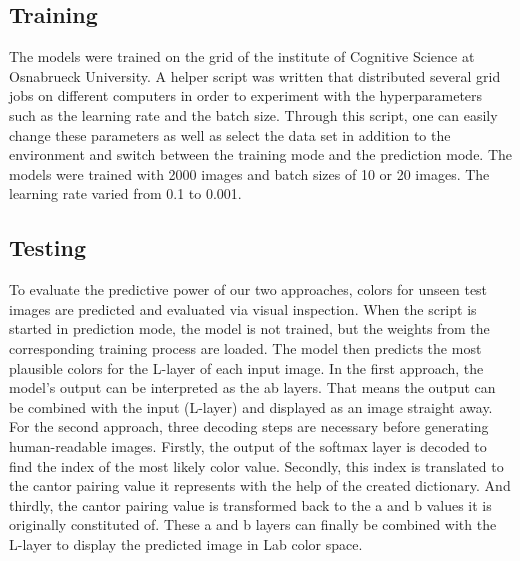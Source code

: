 \documentclass[12pt,letterpaper]{article}
\begin{document}

\subsection{Training}
The models were trained on the grid of the institute of Cognitive Science at Osnabrueck University. A helper script was written that distributed several grid jobs on different computers in order to experiment with the hyperparameters such as the learning rate and the batch size. Through this script, one can easily change these parameters as well as select the data set in addition to the environment and switch between the training mode and the prediction mode. The models were trained with 2000 images and batch sizes of 10 or 20 images. The learning rate varied from 0.1 to 0.001.

\subsection{Testing}
To evaluate the predictive power of our two approaches, colors for unseen test images are predicted and evaluated via visual inspection. When the script is started in prediction mode, the model is not trained, but the weights from the corresponding training process are loaded. The model then predicts the most plausible colors for the L-layer of each input image. In the first approach, the model's output can be interpreted as the ab layers. That means the output can be combined with the input (L-layer) and displayed as an image straight away. For the second approach, three decoding steps are necessary before generating human-readable images. Firstly, the output of the softmax layer is decoded to find the index of the most likely color value. Secondly, this index is translated to the cantor pairing value it represents with the help of the created dictionary. And thirdly, the cantor pairing value is transformed back to the a and b values it is originally constituted of. These a and b layers can finally be combined with the L-layer to display the predicted image in Lab color space.
\end{document}
